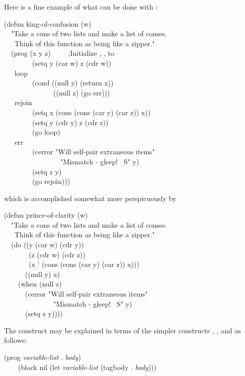 \begin{defmac}
Here is a fine example of what can be done with :
\begin{lisp}
(defun king-of-confusion (w) \\
~~"Take a cons of two lists and make a list of conses. \\
~~~Think of this function as being like a zipper." \\
~~(prog (x y z)~~~~~;{\rm Initialize , ,  to {\false}} \\
~~~~~~~~(setq y (car w) z (cdr w)) \\
~~~loop \\
~~~~~~~~(cond ((null y) (return x)) \\
~~~~~~~~~~~~~~((null z) (go err))) \\
~~~rejoin \\
~~~~~~~~(setq x (cons (cons (car y) (car z)) x)) \\
~~~~~~~~(setq y (cdr y) z (cdr z)) \\
~~~~~~~~(go loop) \\
~~~err \\
~~~~~~~~(cerror "Will self-pair extraneous items" \\
~~~~~~~~~~~~~~~~"Mismatch - gleep!  ~S" y) \\
~~~~~~~~(setq z y) \\
~~~~~~~~(go rejoin)))
\end{lisp}
which is accomplished somewhat more perspicuously by
\begin{lisp}
(defun prince-of-clarity (w) \\
~~"Take a cons of two lists and make a list of conses. \\
~~~Think of this function as being like a zipper." \\
~~(do ((y (car w) (cdr y)) \\
~~~~~~~(z (cdr w) (cdr z)) \\
~~~~~~~(x '{\empty} (cons (cons (car y) (car z)) x))) \\
~~~~~~((null y) x) \\
~~~~(when (null z) \\
~~~~~~(cerror "Will self-pair extraneous items" \\
~~~~~~~~~~~~~~"Mismatch - gleep!  ~S" y) \\
~~~~~~(setq z y))))
\end{lisp}

The  construct may be explained in terms of the simpler
constructs , , and  as
follows:
\begin{lisp}
(prog {\it variable-list}  . {\it body}) \\
~~~\EQ\ (block nil (let {\it variable-list}  (tagbody . {\it body})))
\end{lisp}


\end{defmac}
